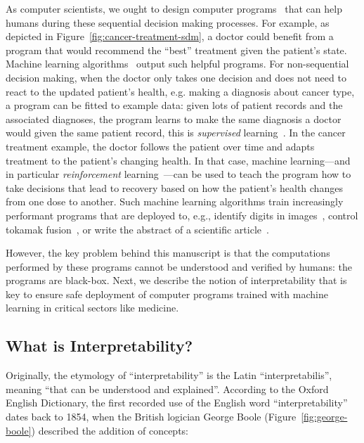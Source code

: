 As computer scientists, we ought to design computer programs~\cite{knuth63} that can help humans during these sequential decision making processes. 
For example, as depicted in Figure~\ref{fig:cancer-treatment-sdm}, a doctor could benefit from a program that would recommend the ``best'' treatment given the patient's state. 
Machine learning algorithms~\cite{turing} output such helpful programs.
For non-sequential decision making, when the doctor only takes one decision and does not need to react to the updated patient's health, e.g. making a diagnosis about cancer type, a program can be fitted to example data: given lots of patient records and the associated diagnoses, the program learns to make the same diagnosis a doctor would given the same patient record, this is \textit{supervised} learning~\cite{sl}. 
In the cancer treatment example, the doctor follows the patient over time and adapts treatment to the patient's changing health. In that case, machine learning—and in particular \textit{reinforcement} learning~\cite{sutton}—can be used to teach the program how to take decisions that lead to recovery based on how the patient's health changes from one dose to another.  
Such machine learning algorithms train increasingly performant programs that are deployed to, e.g., identify digits in images~\cite{lenet}, control tokamak fusion~\cite{tokamak}, or write the abstract of a scientific article~\cite{bert}.

However, the key problem behind this manuscript is that the computations performed by these programs cannot be understood and verified by humans: the programs are black-box.
Next, we describe the notion of interpretability that is key to ensure safe deployment of computer programs trained with machine learning in critical sectors like medicine.

\subsection{What is Interpretability?}


Originally, the etymology of ``interpretability'' is the Latin ``interpretabilis'', meaning ``that can be understood and explained''.
According to the Oxford English Dictionary, the first recorded use of the English word ``interpretability'' dates back to 1854, when the British logician George Boole (Figure~\ref{fig:george-boole}) described the addition of concepts:

